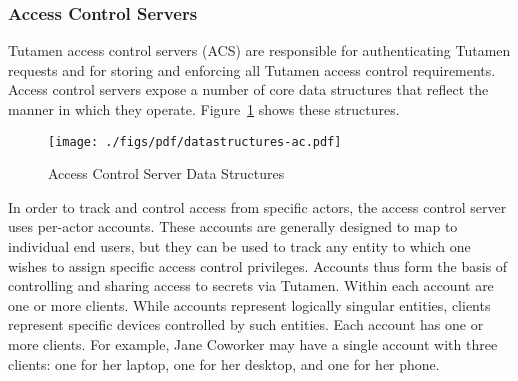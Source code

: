 \subsubsection{Access Control Servers}
\label{sec:tutamen:arch:acs}

Tutamen access control servers (ACS) are responsible for
authenticating Tutamen requests and for storing and enforcing all
Tutamen access control requirements. Access control servers expose a
number of core data structures that reflect the manner in which they
operate. Figure~\ref{fig:tutamen:acstructs} shows these structures.

\begin{figure}[th]
  \centering
  \texttt{[image: ./figs/pdf/datastructures-ac.pdf]}
  \caption{Access Control Server Data Structures}
  \label{fig:tutamen:acstructs}
\end{figure}

In order to track and control access from specific actors, the access
control server uses per-actor accounts. These accounts are generally
designed to map to individual end users, but they can be used to track
any entity to which one wishes to assign specific access control
privileges. Accounts thus form the basis of controlling and sharing
access to secrets via Tutamen. Within each account are one or more
clients. While accounts represent logically singular entities, clients
represent specific devices controlled by such entities. Each account
has one or more clients. For example, Jane Coworker may have a single
account with three clients: one for her laptop, one for her desktop,
and one for her phone.

